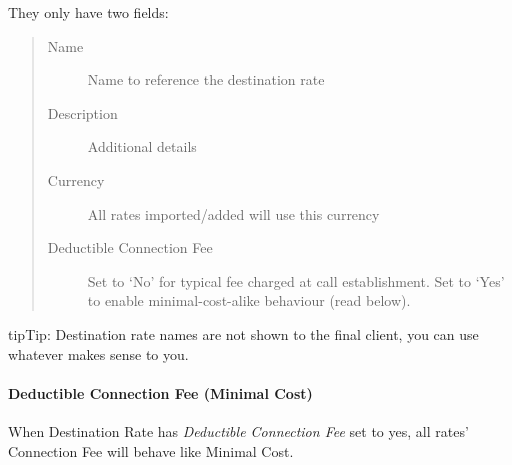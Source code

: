 \documentclass[letterpaper,10pt,english]{sphinxmanual}
\begin{document}
They only have two fields:
\begin{quote}
\begin{description}
\item[{Name}] \leavevmode
Name to reference the destination rate

\item[{Description}] \leavevmode
Additional details

\item[{Currency}] \leavevmode
All rates imported/added will use this currency

\item[{Deductible Connection Fee}] \leavevmode
Set to `No' for typical fee charged at call establishment. Set to `Yes' to enable
minimal-cost-alike behaviour (read below).

\end{description}
\end{quote}

\begin{notice}{tip}{Tip:}
Destination rate names are not shown to the final client, you can use whatever makes sense to you.
\end{notice}


\paragraph{Deductible Connection Fee (Minimal Cost)}
\label{administration_portal/brand/billing/destination_rates:deductible-connection-fee-minimal-cost}
When Destination Rate has \emph{Deductible Connection Fee} set to yes, all rates' Connection Fee will behave like Minimal Cost.
\end{document}
